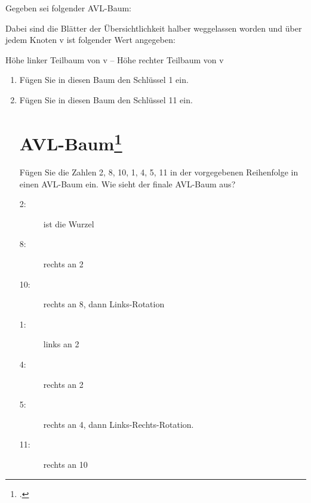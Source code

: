 \documentclass{lehramt-informatik-haupt}
\begin{document}
Gegeben sei folgender AVL-Baum:

Dabei sind die Blätter der Übersichtlichkeit halber weggelassen worden
und über jedem Knoten v ist folgender Wert angegeben:

\begin{center}
Höhe linker Teilbaum von v – Höhe rechter Teilbaum von v
\end{center}

\begin{enumerate}


\item Fügen Sie in diesen Baum den Schlüssel 1 ein.


\item Fügen Sie in diesen Baum den Schlüssel 11 ein.

\section{AVL-Baum\footcite{aud:e-klausur}}

Fügen Sie die Zahlen 2, 8, 10, 1, 4, 5, 11 in der vorgegebenen
Reihenfolge in einen AVL-Baum ein. Wie sieht der finale AVL-Baum aus?

\begin{antwort}
\begin{description}
\item[2:] ist die Wurzel
\item[8:] rechts an 2
\item[10:] rechts an 8, dann Links-Rotation
\item[1:] links an 2
\item[4:] rechts an 2
\item[5:] rechts an 4, dann Links-Rechts-Rotation.
\item[11:] rechts an 10
\end{description}

\end{antwort}

\end{enumerate}

\literatur
\end{document}
